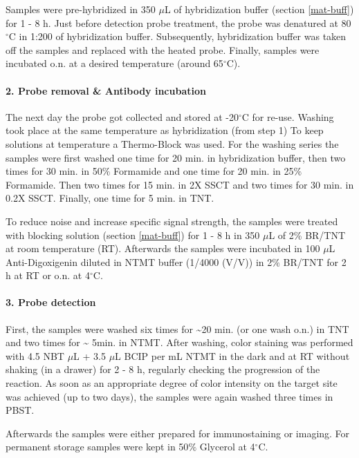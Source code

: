 \documentclass[11pt,singlespacinge,twoside]{reedthesis} %
\theoremstyle{definition}
\theoremstyle{definition}
\theoremstyle{definition}
\theoremstyle{remark}
\begin{document}
Samples were pre-hybridized in 350 \(\mu\)L of hybridization buffer (section \ref{mat-buff}) for 1 - 8 h. Just before detection probe treatment, the probe was denatured at 80\(^\circ\)C in 1:200 of hybridization buffer. Subsequently, hybridization buffer was taken off the samples and replaced with the heated probe. Finally, samples were incubated o.n. at a desired temperature (around 65\(^\circ\)C).

\hypertarget{probe-removal-antibody-incubation}{%
\paragraph{2. Probe removal \& Antibody incubation}\label{probe-removal-antibody-incubation}}

The next day the probe got collected and stored at -20\(^\circ\)C for re-use. Washing took place at the same temperature as hybridization (from step 1) To keep solutions at temperature a Thermo-Block was used. For the washing series the samples were first washed one time for 20 min. in hybridization buffer, then two times for 30 min. in 50\(\%\) Formamide and one time for 20 min. in 25\(\%\) Formamide. Then two times for 15 min. in 2X SSCT and two times for 30 min. in 0.2X SSCT. Finally, one time for 5 min. in TNT.

To reduce noise and increase specific signal strength, the samples were treated with blocking solution (section \ref{mat-buff}) for 1 - 8 h in 350 \(\mu\)L of 2\% BR/TNT at room temperature (RT). Afterwards the samples were incubated in 100 \(\mu\)L Anti-Digoxigenin diluted in NTMT buffer (1/4000 (V/V)) in 2\(\%\) BR/TNT for 2 h at RT or o.n. at 4\(^\circ\)C.

\hypertarget{probe-detection}{%
\paragraph{3. Probe detection}\label{probe-detection}}

First, the samples were washed six times for \textasciitilde20 min. (or one wash o.n.) in TNT and two times for \textasciitilde{} 5min. in NTMT. After washing, color staining was performed with 4.5 NBT \(\mu\)L + 3.5 \(\mu\)L BCIP per mL NTMT in the dark and at RT without shaking (in a drawer) for 2 - 8 h, regularly checking the progression of the reaction. As soon as an appropriate degree of color intensity on the target site was achieved (up to two days), the samples were again washed three times in PBST.

Afterwards the samples were either prepared for immunostaining or imaging. For permanent storage samples were kept in 50\(\%\) Glycerol at 4\(^\circ\)C.
\end{document}
